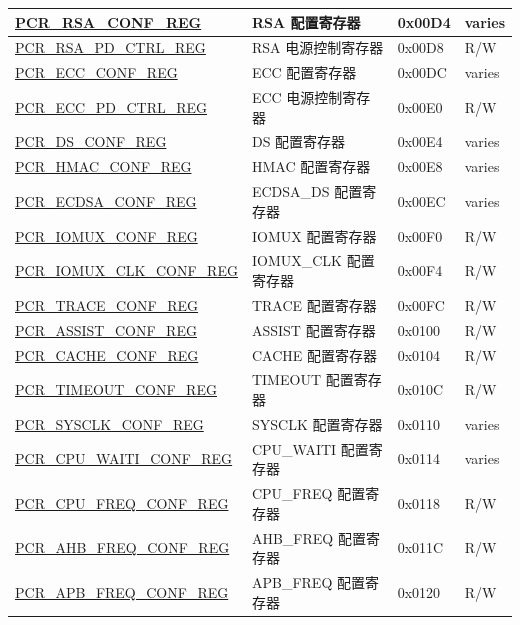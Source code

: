 \begin{longtable}{ | p{7.2cm} | p{6cm} | p{1.3cm} | p{1cm} | }
\hyperref[regdesc:PCRRSACONFREG]{PCR\_RSA\_CONF\_REG} & RSA 配置寄存器 & 0x00D4 & varies \\ \hline
\hyperref[regdesc:PCRRSAPDCTRLREG]{PCR\_RSA\_PD\_CTRL\_REG} & RSA 电源控制寄存器 & 0x00D8 & R/W \\ \hline
\hyperref[regdesc:PCRECCCONFREG]{PCR\_ECC\_CONF\_REG} & ECC 配置寄存器 & 0x00DC & varies \\ \hline
\hyperref[regdesc:PCRECCPDCTRLREG]{PCR\_ECC\_PD\_CTRL\_REG} & ECC 电源控制寄存器 & 0x00E0 & R/W \\ \hline
\hyperref[regdesc:PCRDSCONFREG]{PCR\_DS\_CONF\_REG} & DS 配置寄存器 & 0x00E4 & varies \\ \hline
\hyperref[regdesc:PCRHMACCONFREG]{PCR\_HMAC\_CONF\_REG} & HMAC 配置寄存器 & 0x00E8 & varies \\ \hline
\hyperref[regdesc:PCRECDSACONFREG]{PCR\_ECDSA\_CONF\_REG} & ECDSA\_DS 配置寄存器 & 0x00EC & varies \\ \hline
\hyperref[regdesc:PCRIOMUXCONFREG]{PCR\_IOMUX\_CONF\_REG} & IOMUX 配置寄存器 & 0x00F0 & R/W \\ \hline
\hyperref[regdesc:PCRIOMUXCLKCONFREG]{PCR\_IOMUX\_CLK\_CONF\_REG} & IOMUX\_CLK 配置寄存器 & 0x00F4 & R/W \\ \hline
\hyperref[regdesc:PCRTRACECONFREG]{PCR\_TRACE\_CONF\_REG} & TRACE 配置寄存器 & 0x00FC & R/W \\ \hline
\hyperref[regdesc:PCRASSISTCONFREG]{PCR\_ASSIST\_CONF\_REG} & ASSIST 配置寄存器 & 0x0100 & R/W \\ \hline
\hyperref[regdesc:PCRCACHECONFREG]{PCR\_CACHE\_CONF\_REG} & CACHE 配置寄存器 & 0x0104 & R/W \\ \hline
\hyperref[regdesc:PCRTIMEOUTCONFREG]{PCR\_TIMEOUT\_CONF\_REG} & TIMEOUT 配置寄存器 & 0x010C & R/W \\ \hline
\hyperref[regdesc:PCRSYSCLKCONFREG]{PCR\_SYSCLK\_CONF\_REG} & SYSCLK 配置寄存器 & 0x0110 & varies \\ \hline
\hyperref[regdesc:PCRCPUWAITICONFREG]{PCR\_CPU\_WAITI\_CONF\_REG} & CPU\_WAITI 配置寄存器 & 0x0114 & varies \\ \hline
\hyperref[regdesc:PCRCPUFREQCONFREG]{PCR\_CPU\_FREQ\_CONF\_REG} & CPU\_FREQ 配置寄存器 & 0x0118 & R/W \\ \hline
\hyperref[regdesc:PCRAHBFREQCONFREG]{PCR\_AHB\_FREQ\_CONF\_REG} & AHB\_FREQ 配置寄存器 & 0x011C & R/W \\ \hline
\hyperref[regdesc:PCRAPBFREQCONFREG]{PCR\_APB\_FREQ\_CONF\_REG} & APB\_FREQ 配置寄存器 & 0x0120 & R/W \\ \hline

\end{longtable}

